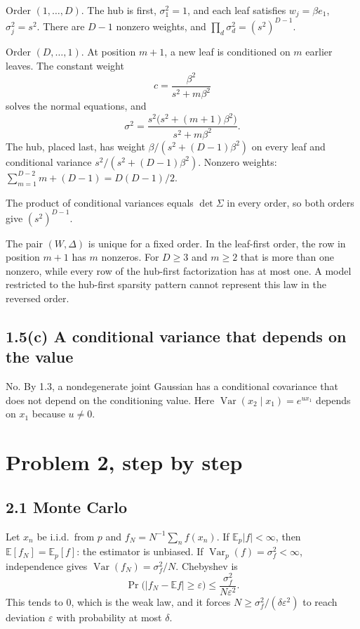 \documentclass[11pt]{article}
\theoremstyle{remark}
\newcommand{\E}{\mathbb{E}}
\newcommand{\Var}{\operatorname{Var}}
\begin{document}
Order \((1,\ldots,D)\). The hub is first, \(\sigma_1^2=1\), and each leaf satisfies \(w_j=\beta e_1\), \(\sigma_j^2=s^2\). There are \(D-1\) nonzero weights, and \(\prod_d\sigma_d^2=(s^2)^{D-1}\).

Order \((D,\ldots,1)\). At position \(m+1\), a new leaf is conditioned on \(m\) earlier leaves. The constant weight
\[
c=\frac{\beta^2}{s^2+m\beta^2}
\]
solves the normal equations, and
\[
\sigma^2=\frac{s^2\big(s^2+(m+1)\beta^2\big)}{s^2+m\beta^2}.
\]
The hub, placed last, has weight \(\beta/(s^2+(D-1)\beta^2)\) on every leaf and conditional variance \(s^2/(s^2+(D-1)\beta^2)\). Nonzero weights: \(\sum_{m=1}^{D-2}m+(D-1)=D(D-1)/2\).

The product of conditional variances equals \(\det\Sigma\) in every order, so both orders give \((s^2)^{D-1}\).

The pair \((W,\Delta)\) is unique for a fixed order. In the leaf-first order, the row in position \(m+1\) has \(m\) nonzeros. For \(D\ge 3\) and \(m\ge 2\) that is more than one nonzero, while every row of the hub-first factorization has at most one. A model restricted to the hub-first sparsity pattern cannot represent this law in the reversed order.

\subsection*{1.5(c) A conditional variance that depends on the value}

No. By 1.3, a nondegenerate joint Gaussian has a conditional covariance that does not depend on the conditioning value. Here \(\Var(x_2\mid x_1)=e^{ux_1}\) depends on \(x_1\) because \(u\ne 0\).

\newpage
\section{Problem 2, step by step}

\subsection*{2.1 Monte Carlo}

Let \(x_n\) be i.i.d.\ from \(p\) and \(f_N=N^{-1}\sum_n f(x_n)\). If \(\E_p|f|<\infty\), then \(\E[f_N]=\E_p[f]\): the estimator is unbiased. If \(\Var_p(f)=\sigma_f^2<\infty\), independence gives \(\Var(f_N)=\sigma_f^2/N\). Chebyshev is
\[
\Pr\big(|f_N-\E f|\ge\varepsilon\big)\le\frac{\sigma_f^2}{N\varepsilon^2}.
\]
This tends to \(0\), which is the weak law, and it forces \(N\ge\sigma_f^2/(\delta\varepsilon^2)\) to reach deviation \(\varepsilon\) with probability at most \(\delta\).
\end{document}
